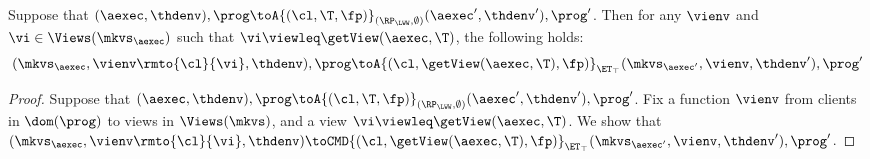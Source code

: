 \begin{proposition}
\label{prop:aexec2kv_transition}
Suppose that $(\aexec, \thdenv), \prog \toA{(\cl, \T, \fp)}_{(\RP_{\LWW}, \emptyset)} (\aexec', \thdenv'), \prog'$. 
Then for any $\vienv$ and $\vi \in \Views(\mkvs_{\aexec})$ such that $\vi \viewleq \getView(\aexec, \T)$, 
the following holds:
\[
    (\mkvs_{\aexec}, \vienv\rmto{\cl}{\vi}, \thdenv), \prog 
    \toA{(\cl, \getView(\aexec, \T), \fp)}_{\ET_{\top}} (\mkvs_{\aexec'}, \vienv, \thdenv'), \prog'
\]
\end{proposition}
\begin{proof}
Suppose that $(\aexec, \thdenv), \prog \toA{(\cl, \T, \fp)}_{(\RP_{\LWW}, \emptyset)} (\aexec', \thdenv'), \prog'$. 
Fix a function $\vienv$ from clients in $\dom(\prog)$ to views in $\Views(\mkvs)$, and a view $\vi \viewleq \getView(\aexec, \T)$.
We show that 
$(\mkvs_{\aexec}, \vienv\rmto{\cl}{\vi}, \thdenv) \toCMD{(\cl, \getView(\aexec, \T), \fp)}_{\ET_{\top}} (\mkvs_{\aexec'}, 
\vienv, \thdenv'), \prog'$. 


\end{proof}
